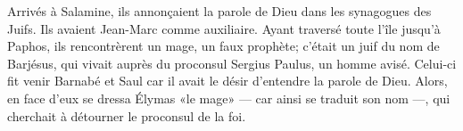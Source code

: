 Arrivés à Salamine,
	ils annonçaient la parole de Dieu dans les synagogues des Juifs.
Ils avaient Jean-Marc comme auxiliaire.
Ayant traversé toute l’île jusqu’à Paphos,
	ils rencontrèrent un mage, un faux prophète;
	c’était un juif du nom de Barjésus,
	qui vivait auprès du proconsul Sergius Paulus, un homme avisé.
Celui-ci fit venir Barnabé et Saul
	car il avait le désir d’entendre la parole de Dieu.
Alors, en face d’eux se dressa Élymas «le mage»
	--- car ainsi se traduit son nom ---,
	qui cherchait à détourner le proconsul de la foi.
